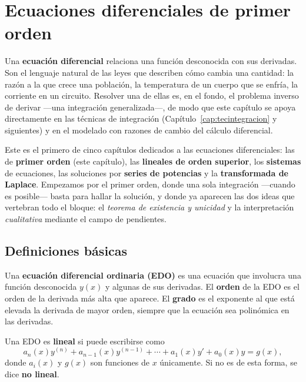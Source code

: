 \chapter{Ecuaciones diferenciales de primer orden}

Una \textbf{ecuación diferencial} relaciona una función desconocida con sus derivadas. Son el lenguaje natural de las leyes que describen cómo cambia una cantidad: la razón a la que crece una población, la temperatura de un cuerpo que se enfría, la corriente en un circuito. Resolver una de ellas es, en el fondo, el problema inverso de derivar —una integración generalizada—, de modo que este capítulo se apoya directamente en las técnicas de integración (Capítulo~\ref{cap:tecintegracion} y siguientes) y en el modelado con razones de cambio del cálculo diferencial.

Este es el primero de cinco capítulos dedicados a las ecuaciones diferenciales: las de \textbf{primer orden} (este capítulo), las \textbf{lineales de orden superior}, los \textbf{sistemas} de ecuaciones, las soluciones por \textbf{series de potencias} y la \textbf{transformada de Laplace}. Empezamos por el primer orden, donde una sola integración —cuando es posible— basta para hallar la solución, y donde ya aparecen las dos ideas que vertebran todo el bloque: el \emph{teorema de existencia y unicidad} y la interpretación \emph{cualitativa} mediante el campo de pendientes.

\section{Definiciones básicas}

\begin{definition}
Una \textbf{ecuación diferencial ordinaria (EDO)} es una ecuación que involucra una función desconocida \(y(x)\) y algunas de sus derivadas. El \textbf{orden} de la EDO es el orden de la derivada más alta que aparece. El \textbf{grado} es el exponente al que está elevada la derivada de mayor orden, siempre que la ecuación sea polinómica en las derivadas.
\end{definition}

\begin{definition}
Una EDO es \textbf{lineal} si puede escribirse como
\[
a_n(x)y^{(n)} + a_{n-1}(x)y^{(n-1)} + \cdots + a_1(x)y' + a_0(x)y = g(x),
\]
donde \(a_i(x)\) y \(g(x)\) son funciones de \(x\) únicamente. Si no es de esta forma, se dice \textbf{no lineal}.
\end{definition}

